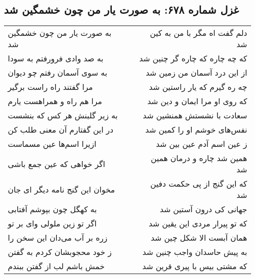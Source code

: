 \begin{center}
\section*{غزل شماره ۶۷۸: به صورت یار من چون خشمگین شد}
\label{sec:0678}
\begin{longtable}{l p{0.5cm} r}
به صورت یار من چون خشمگین شد
&&
دلم گفت اه مگر با من به کین شد
\\
به صد وادی فرورفتم به سودا
&&
که چه چاره که چاره گر چنین شد
\\
به سوی آسمان رفتم چو دیوان
&&
از این درد آسمان من زمین شد
\\
مرا گفتند راه راست برگیر
&&
چه ره گیرم که یار راستین شد
\\
مرا هم راه و همراهست یارم
&&
که روی او مرا ایمان و دین شد
\\
به زیر گلبنش هر کس که بنشست
&&
سعادت با نشستش همنشین شد
\\
در این گفتارم آن معنی طلب کن
&&
نفس‌های خوشم او را کمین شد
\\
ازیرا اسم‌ها عین مسماست
&&
ز عین اسم آدم عین بین شد
\\
اگر خواهی که عین جمع باشی
&&
همین شد چاره و درمان همین شد
\\
مخوان این گنج نامه دیگر ای جان
&&
که این گنج از پی حکمت دفین شد
\\
به کهگل چون بپوشم آفتابی
&&
جهانی کی درون آستین شد
\\
اگر تو زین ملولی وای بر تو
&&
که تو پیرار مردی این یقین شد
\\
زره بر آب می‌دان این سخن را
&&
همان آبست الا شکل چین شد
\\
ز خود محجوبشان کردم به گفتن
&&
به پیش حاسدان واجب چنین شد
\\
خمش باشم لب از گفتن ببندم
&&
که مشتی بیس با پیری قرین شد
\\
\end{longtable}
\end{center}
